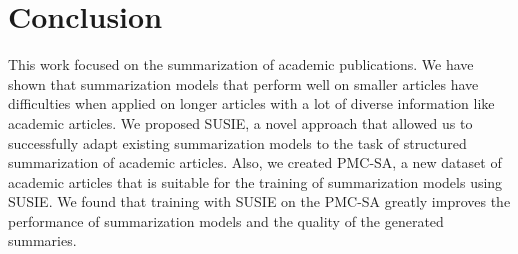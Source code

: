 \documentclass[runningheads]{llncs}
\begin{document}
\section{Conclusion}

This work focused on the summarization of academic publications. We have shown that summarization models that perform well on smaller articles have difficulties when applied on longer articles with a lot of diverse information like academic articles. We proposed SUSIE, a novel approach that allowed us to successfully adapt existing summarization models to the task of structured summarization of academic articles. Also, we created PMC-SA, a new dataset of academic articles that is suitable for the training of summarization models using SUSIE. We found that training with SUSIE on the PMC-SA greatly improves the performance of summarization models and the quality of the generated summaries. 



\end{document}
